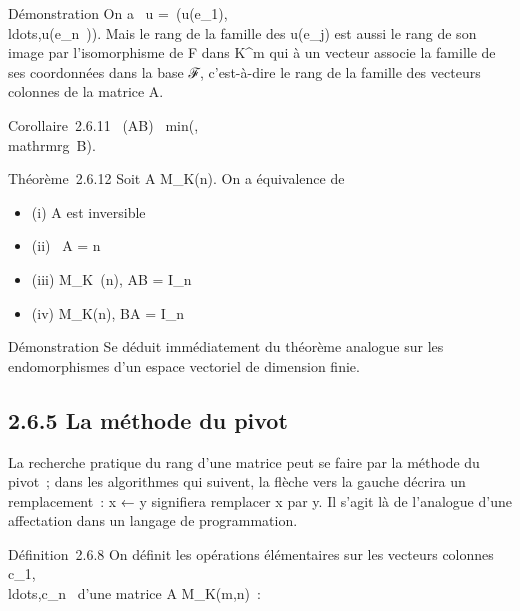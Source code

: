 \documentclass[]{article}
\begin{document}
Démonstration On a
\mathrmrg~u
=\
\mathrmrg(u(e_1),\\ldots,u(e_n~)).
Mais le rang de la famille des u(e_j) est aussi le rang de son
image par l'isomorphisme de F dans K^m qui à un vecteur
associe la famille de ses coordonnées dans la base ℱ, c'est-à-dire le
rang de la famille des vecteurs colonnes de la matrice A.

Corollaire~2.6.11
\mathrmrg~(AB)
\leq\
min(\mathrmrgA,\\mathrmrg~B).

Théorème~2.6.12 Soit A \in M_K(n). On a équivalence de

\begin{itemize}
\itemsep1pt\parskip0pt
\item
  (i) A est inversible
\item
  (ii) \mathrmrg~A = n
\item
  (iii) \existsB \in M_K~(n), AB =
  I_n
\item
  (iv) \existsB \in M_K(n), BA = I_n~
\end{itemize}

Démonstration Se déduit immédiatement du théorème analogue sur les
endomorphismes d'un espace vectoriel de dimension finie.

\subsection{2.6.5 La méthode du pivot}

La recherche pratique du rang d'une matrice peut se faire par la méthode
du pivot~; dans les algorithmes qui suivent, la flèche vers la gauche
décrira un remplacement~: x ← y signifiera remplacer x par y. Il s'agit
là de l'analogue d'une affectation dans un langage de programmation.

Définition~2.6.8 On définit les opérations élémentaires sur les vecteurs
colonnes
c_1,\\ldots,c_n~
d'une matrice A \in M_K(m,n)~:
\end{document}

